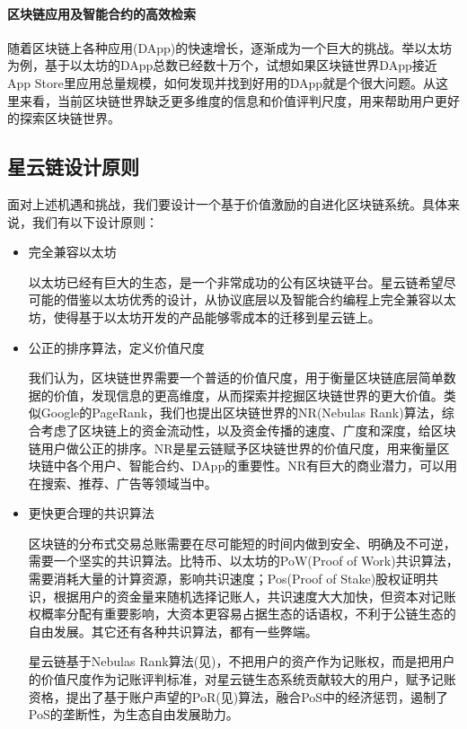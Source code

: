 \paragraph{区块链应用及智能合约的高效检索}随着区块链上各种应用(DApp)的快速增长，逐渐成为一个巨大的挑战。举以太坊为例，基于以太坊的DApp总数已经数十万个，试想如果区块链世界DApp接近App Store里应用总量规模，如何发现并找到好用的DApp就是个很大问题。从这里来看，当前区块链世界缺乏更多维度的信息和价值评判尺度，用来帮助用户更好的探索区块链世界。

\subsection{星云链设计原则}
面对上述机遇和挑战，我们要设计一个基于价值激励的自进化区块链系统。具体来说，我们有以下设计原则：
\begin{itemize}
	\item 完全兼容以太坊

以太坊已经有巨大的生态，是一个非常成功的公有区块链平台。星云链希望尽可能的借鉴以太坊优秀的设计，从协议底层以及智能合约编程上完全兼容以太坊，使得基于以太坊开发的产品能够零成本的迁移到星云链上。
	\item 公正的排序算法，定义价值尺度

我们认为，区块链世界需要一个普适的价值尺度，用于衡量区块链底层简单数据的价值，发现信息的更高维度，从而探索并挖掘区块链世界的更大价值。类似Google的PageRank\cite{Brin2010}\cite{page1999pagerank}，我们也提出区块链世界的NR(Nebulas Rank)算法，综合考虑了区块链上的资金流动性，以及资金传播的速度、广度和深度，给区块链用户做公正的排序。NR是星云链赋予区块链世界的价值尺度，用来衡量区块链中各个用户、智能合约、DApp的重要性。NR有巨大的商业潜力，可以用在搜索、推荐、广告等领域当中。

	\item 更快更合理的共识算法

区块链的分布式交易总账需要在尽可能短的时间内做到安全、明确及不可逆，需要一个坚实的共识算法。比特币、以太坊的PoW(Proof of Work)共识算法，需要消耗大量的计算资源，影响共识速度；Pos(Proof of Stake)股权证明共识，根据用户的资金量来随机选择记账人，共识速度大大加快，但资本对记账权概率分配有重要影响，大资本更容易占据生态的话语权，不利于公链生态的自由发展。其它还有各种共识算法，都有一些弊端。

星云链基于Nebulas Rank算法(见)，不把用户的资产作为记账权，而是把用户的价值尺度作为记账评判标准，对星云链生态系统贡献较大的用户，赋予记账资格，提出了基于账户声望的PoR(见)算法，融合PoS中的经济惩罚，遏制了PoS的垄断性，为生态自由发展助力。


\end{itemize}
